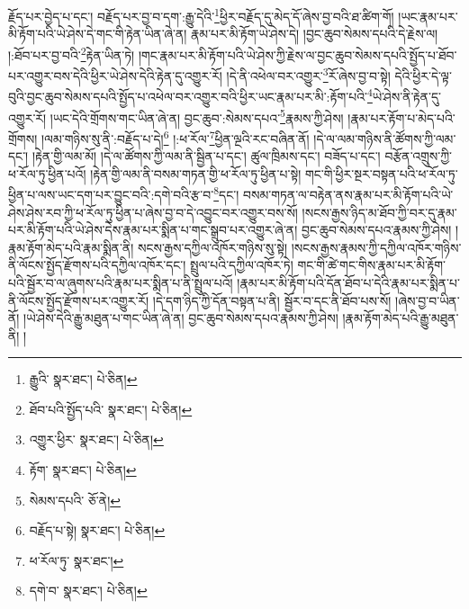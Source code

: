 རྗོད་པར་བྱེད་པ་དང་། བརྗོད་པར་བྱ་བ་དག་:རྒྱུ་དེའི་\footnote{རྒྱུའི་  སྣར་ཐང་།  པེ་ཅིན། }ཕྱིར་བརྗོད་དུ་མེད་དོ་ཞེས་བྱ་བའི་ཐ་ཚིག་གོ། །ཡང་རྣམ་པར་མི་རྟོག་པའི་ཡེ་ཤེས་དེ་གང་གི་རྟེན་ཡིན་ཞེ་ན། རྣམ་པར་མི་རྟོག་ཡེ་ཤེས་དེ། །བྱང་ཆུབ་སེམས་དཔའི་དེ་རྗེས་ལ། །:ཐོབ་པར་བྱ་བའི་\footnote{ཐོབ་པའི་སྤྱོད་པའི་  སྣར་ཐང་།  པེ་ཅིན། }རྟེན་ཡིན་ཏེ། །གང་རྣམ་པར་མི་རྟོག་པའི་ཡེ་ཤེས་ཀྱི་རྗེས་ལ་བྱང་ཆུབ་སེམས་དཔའི་སྤྱོད་པ་ཐོབ་པར་འགྱུར་བས་དེའི་ཕྱིར་ཡེ་ཤེས་དེའི་རྟེན་དུ་འགྱུར་རོ། །དེ་ནི་འཕེལ་བར་འགྱུར་\footnote{འགྱུར་ཕྱིར་  སྣར་ཐང་།  པེ་ཅིན། }རོ་ཞེས་བྱ་བ་སྟེ། དེའི་ཕྱིར་དེ་ལྟ་བུའི་བྱང་ཆུབ་སེམས་དཔའི་སྤྱོད་པ་འཕེལ་བར་འགྱུར་བའི་ཕྱིར་ཡང་རྣམ་པར་མི་:རྟོག་པའི་\footnote{རྟོག་  སྣར་ཐང་།  པེ་ཅིན། }ཡེ་ཤེས་ནི་རྟེན་དུ་འགྱུར་རོ། །ཡང་དེའི་གྲོགས་གང་ཡིན་ཞེ་ན། བྱང་ཆུབ་:སེམས་དཔའ་\footnote{སེམས་དཔའི་  ཅོ་ནེ། }རྣམས་ཀྱི་ཤེས། །རྣམ་པར་རྟོག་པ་མེད་པའི་གྲོགས། །ལམ་གཉིས་སུ་ནི་:བརྗོད་པ་དེ།\footnote{བརྗོད་པ་སྟེ།  སྣར་ཐང་།  པེ་ཅིན། } །:ཕ་རོལ་\footnote{ཕ་རོལ་ཏུ་  སྣར་ཐང་། }ཕྱིན་ལྔའི་རང་བཞིན་ནོ། །དེ་ལ་ལམ་གཉིས་ནི་ཚོགས་ཀྱི་ལམ་དང་། །རྟེན་གྱི་ལམ་མོ། །དེ་ལ་ཚོགས་ཀྱི་ལམ་ནི་སྦྱིན་པ་དང་། ཚུལ་ཁྲིམས་དང་། བཟོད་པ་དང་། བརྩོན་འགྲུས་ཀྱི་ཕ་རོལ་ཏུ་ཕྱིན་པའོ། །རྟེན་གྱི་ལམ་ནི་བསམ་གཏན་གྱི་ཕ་རོལ་ཏུ་ཕྱིན་པ་སྟེ། གང་གི་ཕྱིར་སྔར་བསྟན་པའི་ཕ་རོལ་ཏུ་ཕྱིན་པ་ལས་ཡང་དག་པར་བྱུང་བའི་:དགེ་བའི་རྩ་བ་\footnote{དགེ་བ་  སྣར་ཐང་།  པེ་ཅིན། }དང་། བསམ་གཏན་ལ་བརྟེན་ནས་རྣམ་པར་མི་རྟོག་པའི་ཡེ་ཤེས་ཤེས་རབ་ཀྱི་ཕ་རོལ་ཏུ་ཕྱིན་པ་ཞེས་བྱ་བ་དེ་འབྱུང་བར་འགྱུར་བས་སོ། །སངས་རྒྱས་ཉིད་མ་ཐོབ་ཀྱི་བར་དུ་རྣམ་པར་མི་རྟོག་པའི་ཡེ་ཤེས་དེས་རྣམ་པར་སྨིན་པ་གང་སྒྲུབ་པར་འགྱུར་ཞེ་ན། བྱང་ཆུབ་སེམས་དཔའ་རྣམས་ཀྱི་ཤེས། །རྣམ་རྟོག་མེད་པའི་རྣམ་སྨིན་ནི། སངས་རྒྱས་དཀྱིལ་འཁོར་གཉིས་སུ་སྟེ། །སངས་རྒྱས་རྣམས་ཀྱི་དཀྱིལ་འཁོར་གཉིས་ནི་ལོངས་སྤྱོད་རྫོགས་པའི་དཀྱིལ་འཁོར་དང་། སྤྲུལ་པའི་དཀྱིལ་འཁོར་ཏེ། གང་གི་ཚེ་གང་གིས་རྣམ་པར་མི་རྟོག་པའི་སྦྱོར་བ་ལ་ཞུགས་པའི་རྣམ་པར་སྨིན་པ་ནི་སྤྲུལ་པའོ། །རྣམ་པར་མི་རྟོག་པའི་དོན་ཐོབ་པ་དེའི་རྣམ་པར་སྨིན་པ་ནི་ལོངས་སྤྱོད་རྫོགས་པར་འགྱུར་རོ། །དེ་དག་ཉིད་ཀྱི་དོན་བསྟན་པ་ནི། སྦྱོར་བ་དང་ནི་ཐོབ་པས་སོ། །ཞེས་བྱ་བ་ཡིན་ནོ། །ཡེ་ཤེས་དེའི་རྒྱུ་མཐུན་པ་གང་ཡིན་ཞེ་ན། བྱང་ཆུབ་སེམས་དཔའ་རྣམས་ཀྱི་ཤེས། །རྣམ་རྟོག་མེད་པའི་རྒྱུ་མཐུན་ནི། །
